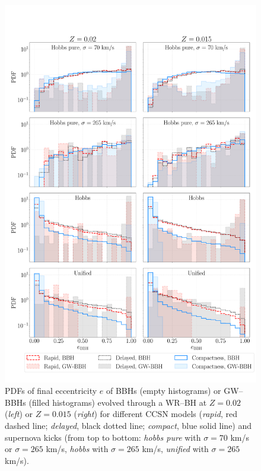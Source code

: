 \documentclass[a4paper,titlepage]{book}     	%
\begin{document}
\begin{figure}
	\centering
	\includegraphics[width=\textwidth]{./images/remeccentricity.pdf}	
	\caption{PDFs of final eccentricity $e$ of BBHs (empty histograms) or GW--BBHs (filled histograms) evolved through a WR--BH at $Z=0.02$ (\emph{left}) or $Z=0.015$ (\emph{right}) for different CCSN models (\emph{rapid}, red dashed line; \emph{delayed}, black dotted line; \emph{compact}, blue solid line) and supernova kicks (from top to bottom: \emph{hobbs pure} with $\sigma = 70$ km/s or $\sigma = 265$ km/s, \emph{hobbs} with $\sigma = 265$ km/s, \emph{unified} with $\sigma = 265$ km/s).}\label{fig:resultsRemEccentricity}
\end{figure}
\end{document}
